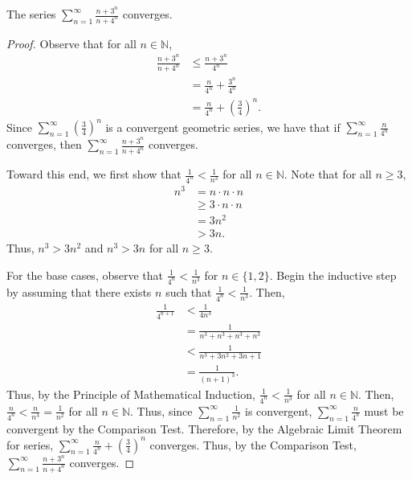 \documentclass[12pt]{article}
\begin{document}
\newpage
{} The series $\sum\limits_{n=1}^\infty \frac{n+3^n}{n+4^n}$ converges.
\begin{proof}
    Observe that for all $n \in \mathbb N$,
    \begin{align*}
        \frac{n+3^n}{n+4^n} &\leq \frac{n+3^n}{4^n} \\
                            &= \frac n{4^n} + \frac{3^n}{4^n} \\
                            &= \frac n{4^n} + \left(\frac34\right)^n.
    \end{align*}
    Since $\sum\limits_{n=1}^\infty \left(\frac34\right)^n$ is a convergent geometric series, we have that if $\sum\limits_{n=1}^\infty\frac{n}{4^n}$ converges, then $\sum\limits_{n=1}^\infty \frac{n+3^n}{n+4^n}$ converges.
    
    Toward this end, we first show that $\frac1{4^n} < \frac1{n^3}$ for all $n \in \mathbb N$. Note that for all $n \geq 3$,
    \begin{align*}
        n^3 &= n \cdot n \cdot n \\
            &\geq 3 \cdot n \cdot n \\
            &= 3n^2 \\
            &> 3n.
    \end{align*} Thus, $n^3 > 3n^2$ and $n^3 > 3n$ for all $n \geq 3$.
    
    For the base cases, observe that $\frac1{4^n} < \frac1{n^3}$ for $n \in \{1,2\}$. Begin the inductive step by assuming that there exists $n$ such that $\frac1{4^{n}} < \frac1{n^3}$. Then,
    \begin{align*}
        \frac1{4^{n+1}} &< \frac1{4n^3} \\
                        &= \frac1{n^3 + n^3 + n^3 + n^3} \\
                        &< \frac1{n^3 + 3n^2 + 3n + 1} \\
                        &= \frac1{(n+1)^3}.
    \end{align*} Thus, by the Principle of Mathematical Induction, $\frac1{4^n} < \frac1{n^3}$ for all $n \in \mathbb N$. Then, $\frac n {4^n} < \frac n {n^3} = \frac 1 {n^2}$ for all $n \in \mathbb N$. Thus, since $\sum\limits_{n=1}^\infty \frac1{n^2}$ is convergent, $\sum\limits_{n=1}^\infty \frac n {4^n}$ must be convergent by the Comparison Test. Therefore, by the Algebraic Limit Theorem for series, $\sum\limits_{n=1}^\infty \frac n{4^n} + \left(\frac34\right)^n$ converges. Thus, by the Comparison Test, $\sum\limits_{n=1}^\infty \frac{n+3^n}{n+4^n}$ converges.
\end{proof}
\end{document}
